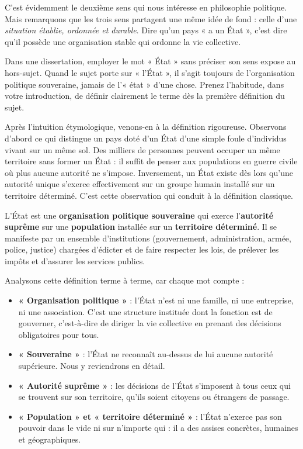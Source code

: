 \documentclass[11pt]{article}
\newcommand{\cle}[1]{{\popxbold\color{popdark}#1}}
\newcounter{popsec}
\newcounter{popsub}
\newcommand{\courssub}[1]{%
  \stepcounter{popsub}%
  \par\vspace{9pt}\noindent{\popxbold\fontsize{11.5}{13}\selectfont\color{popink}{\color{poporange}\thepopsec.\thepopsub}\hspace{6pt}#1}\par\nopagebreak\vspace{4pt}
}
\begin{document}
C'est évidemment le deuxième sens qui nous intéresse en philosophie politique. Mais remarquons que les trois sens partagent une même idée de fond : celle d'une \emph{situation établie, ordonnée et durable}. Dire qu'un pays « a un État », c'est dire qu'il possède une organisation stable qui ordonne la vie collective.

\begin{attention}
Dans une dissertation, employer le mot « État » sans préciser son sens expose au hors-sujet. Quand le sujet porte sur « l'État », il s'agit toujours de l'organisation politique souveraine, jamais de l'« état » d'une chose. Prenez l'habitude, dans votre introduction, de définir clairement le terme dès la première définition du sujet.
\end{attention}

\courssub{Définition de l'État}

Après l'intuition étymologique, venons-en à la définition rigoureuse. Observons d'abord ce qui distingue un pays doté d'un État d'une simple foule d'individus vivant sur un même sol. Des milliers de personnes peuvent occuper un même territoire sans former un État : il suffit de penser aux populations en guerre civile où plus aucune autorité ne s'impose. Inversement, un État existe dès lors qu'une autorité unique s'exerce effectivement sur un groupe humain installé sur un territoire déterminé. C'est cette observation qui conduit à la définition classique.

\begin{definition}[L'État]
L'\cle{État} est une \textbf{organisation politique souveraine} qui exerce l'\textbf{autorité suprême} sur une \textbf{population} installée sur un \textbf{territoire déterminé}. Il se manifeste par un ensemble d'institutions (gouvernement, administration, armée, police, justice) chargées d'édicter et de faire respecter les lois, de prélever les impôts et d'assurer les services publics.
\end{definition}

Analysons cette définition terme à terme, car chaque mot compte :

\begin{itemize}
\item \textbf{« Organisation politique »} : l'État n'est ni une famille, ni une entreprise, ni une association. C'est une structure instituée dont la fonction est de gouverner, c'est-à-dire de diriger la vie collective en prenant des décisions obligatoires pour tous.
\item \textbf{« Souveraine »} : l'État ne reconnaît au-dessus de lui aucune autorité supérieure. Nous y reviendrons en détail.
\item \textbf{« Autorité suprême »} : les décisions de l'État s'imposent à tous ceux qui se trouvent sur son territoire, qu'ils soient citoyens ou étrangers de passage.
\item \textbf{« Population » et « territoire déterminé »} : l'État n'exerce pas son pouvoir dans le vide ni sur n'importe qui : il a des assises concrètes, humaines et géographiques.
\end{itemize}
\end{document}
